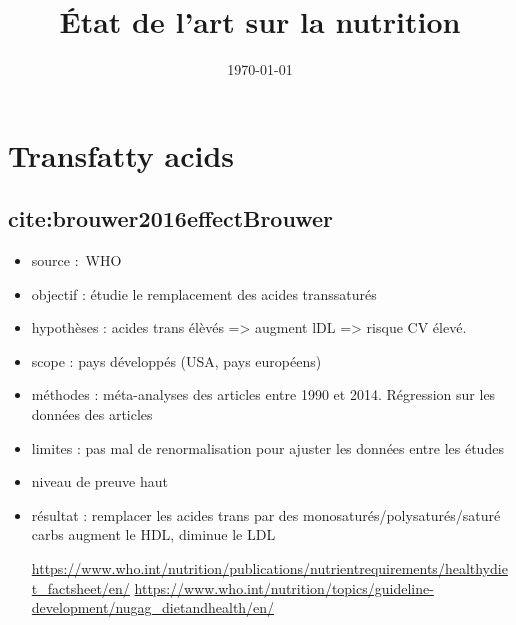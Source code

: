 \documentclass[11pt]{article}
\date{\today}
\title{État de l'art sur la nutrition}
\begin{document}
\maketitle
\tableofcontents


\section{Transfatty acids}
\label{sec:org0bba6d2}
\subsection{cite:brouwer2016effectBrouwer}
\label{sec:orgd592857}
\begin{itemize}
\item source : WHO
\item objectif : étudie le remplacement des acides transsaturés
\item hypothèses : acides trans élèvés => augment lDL => risque CV élevé.
\item scope : pays développés (USA, pays européens)
\item méthodes : méta-analyses des articles entre 1990 et 2014. Régression
sur les données des articles
\item limites : pas mal de renormalisation pour ajuster les données entre les études
\item niveau de preuve haut
\item résultat : remplacer les acides trans par des monosaturés/polysaturés/saturé
carbs augment le HDL, diminue le LDL

\url{https://www.who.int/nutrition/publications/nutrientrequirements/healthydiet\_factsheet/en/}
\url{https://www.who.int/nutrition/topics/guideline-development/nugag\_dietandhealth/en/}
\end{itemize}
\end{document}

